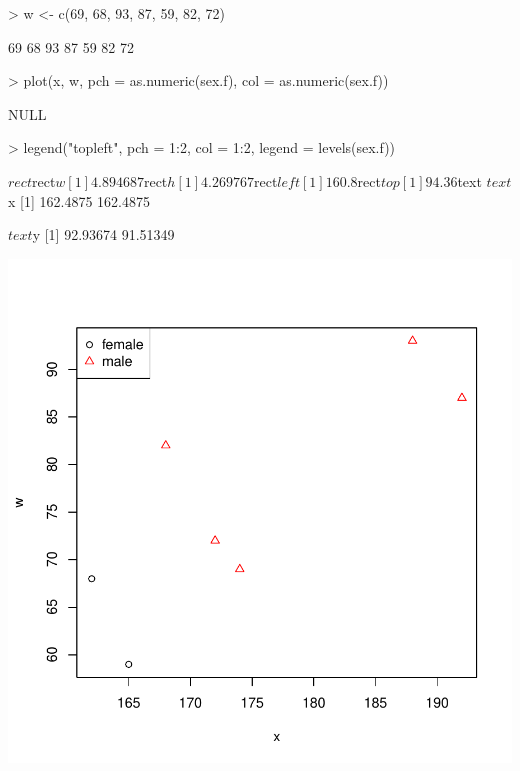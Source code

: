 \documentclass[a4paper,11pt]{scrartcl}
\begin{document}
\begin{Schunk}
\begin{Sinput}
> w <- c(69, 68, 93, 87, 59, 82, 72)
\end{Sinput}
\begin{Soutput}
[1] 69 68 93 87 59 82 72
\end{Soutput}
\end{Schunk}
\begin{Schunk}
\begin{Sinput}
> plot(x, w, pch = as.numeric(sex.f), col = as.numeric(sex.f))
\end{Sinput}
\begin{Soutput}
NULL
\end{Soutput}
\begin{Sinput}
> legend("topleft", pch = 1:2, col = 1:2, legend = levels(sex.f))
\end{Sinput}
\begin{Soutput}
$rect
$rect$w
[1] 4.894687

$rect$h
[1] 4.269767

$rect$left
[1] 160.8

$rect$top
[1] 94.36


$text
$text$x
[1] 162.4875 162.4875

$text$y
[1] 92.93674 91.51349
\end{Soutput}
\end{Schunk}
\includegraphics{r3-015}
\end{document}
